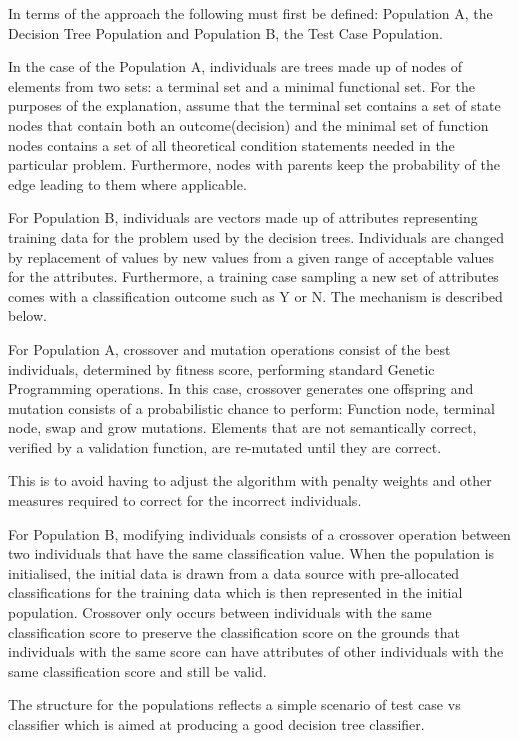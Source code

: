 \documentclass[12pt]{article}
\begin{document}
In terms of the approach the following must first be defined: Population A, the Decision Tree Population and Population B, the Test Case Population.

In the case of the Population A, individuals are trees made up of nodes of elements from two sets: a terminal set and a minimal functional set. For the purposes of the explanation, assume that the terminal set contains a set of state nodes that contain both an outcome(decision) and the minimal set of function nodes contains a set of all theoretical condition statements needed in the particular problem. Furthermore, nodes with parents keep the probability of the edge leading to them where applicable.

For Population B, individuals are vectors made up of attributes representing training data for the problem used by the decision trees. Individuals are changed by replacement of values by new values from a given range of acceptable values for the attributes. Furthermore, a training case sampling a new set of attributes comes with a classification outcome such as Y or N. The mechanism is described below.

For Population A, crossover and mutation operations consist of the best individuals, determined by fitness score, performing standard Genetic Programming operations. In this case, crossover generates one offspring and mutation consists of a probabilistic chance to perform: Function node, terminal node, swap and grow mutations. Elements that are not semantically correct, verified by a validation function, are re-mutated until they are correct.

This is to avoid having to adjust the algorithm with penalty weights and other measures required to correct for the incorrect individuals.

For Population B, modifying individuals consists of a crossover operation between two individuals that have the same classification value. When the population is initialised, the initial data is drawn from a data source with pre-allocated classifications for the training data which is then represented in the initial population. Crossover only occurs between individuals with the same classification score to preserve the classification score on the grounds that individuals with the same score can have attributes of other individuals with the same classification score and still be valid.

The structure for the populations reflects a simple scenario of test case vs classifier which is aimed at producing a good decision tree classifier. 
\end{document}
